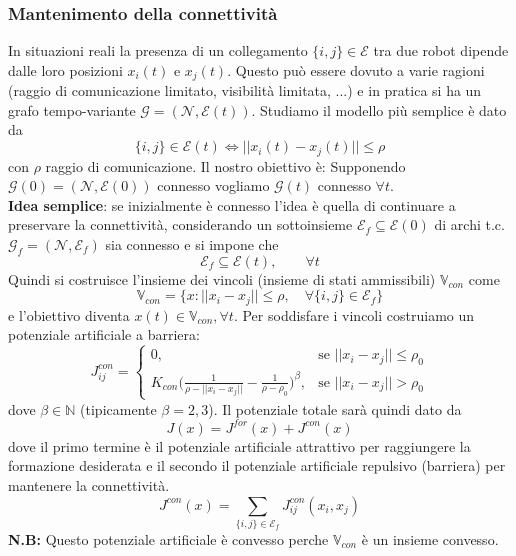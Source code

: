 \subsubsection{Mantenimento della connettivit\`a}
In situazioni reali la presenza di un collegamento $\{i,j\} \in \mathcal{E}$ tra due robot dipende dalle loro posizioni $x_i(t)$ e $x_j(t)$. Questo pu\`o essere dovuto a varie ragioni (raggio di comunicazione limitato, visibilit\`a limitata, ...) e in pratica si ha un grafo tempo-variante $\mathcal{G} = (\mathcal{N}, \mathcal{E}(t))$. Studiamo il modello pi\`u semplice \`e dato da
\begin{equation}
\{i,j\} \in \mathcal{E}(t) \iff ||x_i(t) - x_j(t)|| \leq \rho
\end{equation} con $\rho$ raggio di comunicazione. Il nostro obiettivo \`e:
Supponendo $\mathcal{G}(0) = (\mathcal{N}, \mathcal{E}(0))$ connesso vogliamo $\mathcal{G}(t)$ connesso $\forall t$. \\
\textbf{Idea semplice}: se inizialmente \`e connesso l'idea \`e quella di continuare a preservare la connettivit\`a, considerando un sottoinsieme $\mathcal{E}_f \subseteq \mathcal{E}(0)$ di archi t.c. $\mathcal{G}_f = (\mathcal{N}, \mathcal{E}_f)$ sia connesso e si impone che
\begin{equation}
\mathcal{E}_f \subseteq \mathcal{E}(t), \qquad \forall t
\end{equation} Quindi si costruisce l'insieme dei vincoli (insieme di stati ammissibili) $\mathbb{V}_{con}$ come
\begin{equation}
\mathbb{V}_{con} = \{ x: ||x_i - x_j || \leq \rho, \quad \forall \{i,j\} \in \mathcal{E}_f \}
\end{equation} e l'obiettivo diventa $x(t) \in \mathbb{V}_{con}, \forall t$. 
Per soddisfare i vincoli costruiamo un potenziale artificiale a barriera:
\begin{equation}
J_{ij}^{con} = \begin{cases}
0, & \text{se } ||x_i - x_j|| \leq \rho_0 \\
K_{con} \Big ( \frac{1}{\rho - ||x_i - x_j||} - \frac{1}{\rho - \rho_0} \Big )^\beta, & \text{se } ||x_i - x_j|| > \rho_0
\end{cases}
\end{equation} dove $\beta \in \mathbb{N}$ (tipicamente $\beta=2,3$). Il potenziale totale sar\`a quindi dato da
\begin{equation}
J(x) = J^{for}(x) + J^{con}(x)
\end{equation} dove il primo termine \`e il potenziale artificiale attrattivo per raggiungere la formazione desiderata e il secondo il potenziale artificiale repulsivo (barriera) per mantenere la connettivit\`a.
\begin{equation}
J^{con}(x) = \sum_{\{i,j\} \in \mathcal{E}_f} J_{ij}^{con} (x_i, x_j)
\end{equation} \textbf{N.B:} Questo potenziale artificiale \`e convesso perche $\mathbb{V}_{con}$ \`e un insieme convesso.

